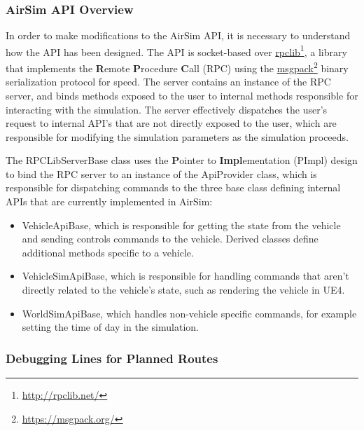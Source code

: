 \subsubsection{AirSim API Overview}
In order to make modifications to the AirSim API, it is necessary to understand how the API has been designed. The API is socket-based over \href{http://rpclib.net/}{rpclib}\footnote{\href{http://rpclib.net/}{http://rpclib.net/}}, a library that implements the \textbf{R}emote \textbf{P}rocedure \textbf{C}all (RPC) using the \href{https://msgpack.org/}{msgpack}\footnote{\href{https://msgpack.org/}{https://msgpack.org/}} binary serialization protocol for speed. The server contains an instance of the RPC server, and binds methods exposed to the user to internal methods responsible for interacting with the simulation. The server effectively dispatches the user's request to internal API's that are not directly exposed to the user, which are responsible for modifying the simulation parameters as the simulation proceeds.

The RPCLibServerBase class uses the \textbf{P}ointer to \textbf{Impl}ementation (PImpl) design to bind the RPC server to an instance of the ApiProvider class, which is responsible for dispatching commands to the three base class defining internal APIs that are currently implemented in AirSim:
\begin{itemize}
    \item VehicleApiBase, which is responsible for getting the state from the vehicle and sending controls commands to the vehicle. Derived classes define additional methods specific to a vehicle.
    \item VehicleSimApiBase, which is responsible for handling commands that aren't directly related to the vehicle's state, such as rendering the vehicle in UE4.
    \item WorldSimApiBase, which handles non-vehicle specific commands, for example setting the time of day in the simulation.
\end{itemize}


\subsubsection{Debugging Lines for Planned Routes}

